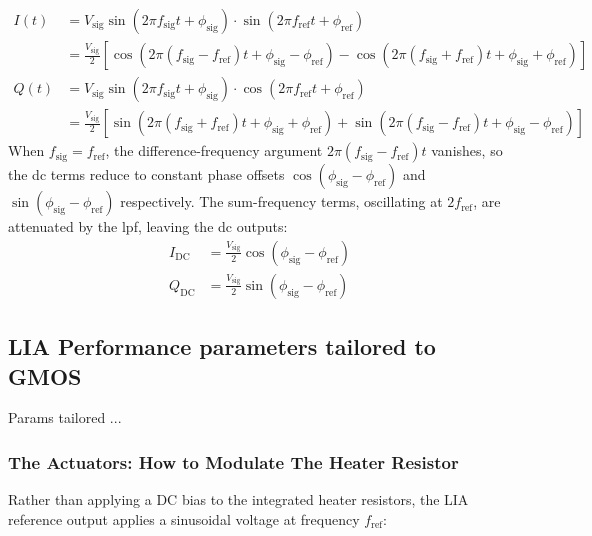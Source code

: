 \begin{align}
  I(t) &= V_\mathrm{sig}\sin(2\pi f_\mathrm{sig}t + \phi_\mathrm{sig})
          \cdot\sin(2\pi f_\mathrm{ref}t + \phi_\mathrm{ref})
          \nonumber\\
       &= \frac{V_\mathrm{sig}}{2}\left[
            \cos\left(2\pi(f_\mathrm{sig}-f_\mathrm{ref})t
                      +\phi_\mathrm{sig}-\phi_\mathrm{ref}\right)
          - \cos\left(2\pi(f_\mathrm{sig}+f_\mathrm{ref})t
                      +\phi_\mathrm{sig}+\phi_\mathrm{ref}\right)
          \right]
          \label{eq:I_channel}\\
  Q(t) &= V_\mathrm{sig}\sin(2\pi f_\mathrm{sig}t + \phi_\mathrm{sig})
          \cdot\cos(2\pi f_\mathrm{ref}t + \phi_\mathrm{ref})
          \nonumber\\
       &= \frac{V_\mathrm{sig}}{2}\left[
            \sin\left(2\pi(f_\mathrm{sig}+f_\mathrm{ref})t
                      +\phi_\mathrm{sig}+\phi_\mathrm{ref}\right)
          + \sin\left(2\pi(f_\mathrm{sig}-f_\mathrm{ref})t
                      +\phi_\mathrm{sig}-\phi_\mathrm{ref}\right)
          \right]
          \label{eq:Q_channel}
\end{align}
When $f_\mathrm{sig} = f_\mathrm{ref}$, the difference-frequency argument
$2\pi(f_\mathrm{sig}-f_\mathrm{ref})t$ vanishes, so the \gls{dc} terms reduce
to constant phase offsets $\cos(\phi_\mathrm{sig}-\phi_\mathrm{ref})$ and
$\sin(\phi_\mathrm{sig}-\phi_\mathrm{ref})$ respectively. The sum-frequency
terms, oscillating at $2f_\mathrm{ref}$, are attenuated by the \gls{lpf},
leaving the \gls{dc} outputs:
\begin{align}
  I_\mathrm{DC} &= \frac{V_\mathrm{sig}}{2}\cos(\phi_\mathrm{sig}-\phi_\mathrm{ref})
                   \label{eq:I_dc}\\
  Q_\mathrm{DC} &= \frac{V_\mathrm{sig}}{2}\sin(\phi_\mathrm{sig}-\phi_\mathrm{ref})
                   \label{eq:Q_dc}
\end{align}

\subsection{LIA Performance parameters tailored to GMOS}
Params tailored ...

\subsubsection{The Actuators: How to Modulate The Heater Resistor}
Rather than applying a DC bias to the integrated heater resistors, the LIA reference output applies a sinusoidal voltage at frequency $f_{\mathrm{ref}}$:

